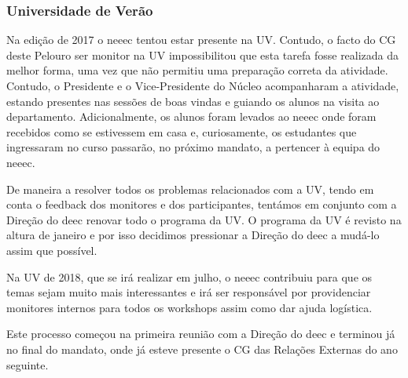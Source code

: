 
\subsubsection{Universidade de Verão}

Na edição de 2017 o \acrshort{neeec} tentou estar presente na UV. Contudo, o facto do CG deste Pelouro ser monitor na UV impossibilitou que esta tarefa fosse realizada da melhor forma, uma vez que não permitiu uma preparação correta da atividade. Contudo, o Presidente e o Vice-Presidente do Núcleo acompanharam a atividade, estando presentes nas sessões de boas vindas e guiando os alunos na visita ao departamento. Adicionalmente, os alunos foram levados ao \acrshort{neeec} onde foram recebidos como se estivessem em casa e, curiosamente, os estudantes que ingressaram no curso passarão, no próximo mandato, a pertencer à equipa do \acrshort{neeec}.

De maneira a resolver todos os problemas relacionados com a UV, tendo em conta o feedback dos monitores e dos participantes, tentámos em conjunto com a Direção do \acrshort{deec} renovar todo o programa da UV. O programa da UV é revisto na altura de janeiro e por isso decidimos pressionar a Direção do \acrshort{deec} a mudá-lo assim que possível. 

Na UV de 2018, que se irá realizar em julho, o \acrshort{neeec} contribuiu para que os temas sejam muito mais interessantes e irá ser responsável por providenciar monitores internos para todos os workshops assim como dar ajuda logística.

Este processo começou na primeira reunião com a Direção do \acrshort{deec} e terminou já no final do mandato, onde já esteve presente o CG das Relações Externas do ano seguinte.